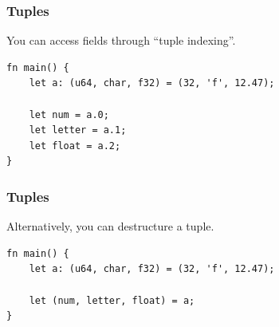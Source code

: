 \documentclass[aspectratio=169]{beamer}
\begin{document}
\begin{frame}[fragile]
    \frametitle{Tuples}
    You can access fields through ``tuple indexing''.   
    \pause
    \begin{verbatim}
fn main() {
    let a: (u64, char, f32) = (32, 'f', 12.47);

    let num = a.0;
    let letter = a.1;
    let float = a.2;
}
    \end{verbatim}
\end{frame}

\begin{frame}[fragile]
    \frametitle{Tuples}
    Alternatively, you can destructure a tuple.   
    \pause
    \begin{verbatim}
fn main() {
    let a: (u64, char, f32) = (32, 'f', 12.47);

    let (num, letter, float) = a;
}
    \end{verbatim}
\end{frame}
\end{document}
